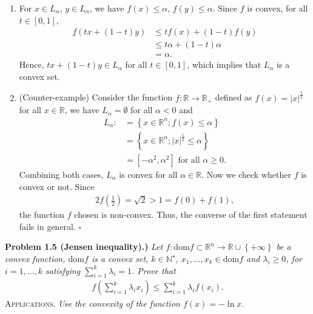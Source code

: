 \documentclass[a4paper]{article}
\numberwithin{equation}{section}
\begin{document}
\begin{enumerate}
\item For $x\in L_\alpha$, $y\in L_\alpha$, we have $f\left(x\right)\le \alpha$, $f\left(y\right)\le \alpha$. Since $f$ is convex, for all $t\in \left[0,1\right]$,
\begin{align}
f\left( {tx + \left( {1 - t} \right)y} \right) &\le tf\left( x \right) + \left( {1 - t} \right)f\left( y \right)\\
& \le t\alpha  + \left( {1 - t} \right)\alpha \\
& = \alpha .
\end{align}
Hence, $tx + \left( {1 - t} \right)y \in {L_\alpha }$ for all $t\in \left[0,1\right]$, which implies that $L_\alpha$ is a convex set.
\item (Counter-example) Consider the function $f: \mathbb{R}\to \mathbb{R}_+$ defined as $f\left( x \right) = {\left| x \right|^{\frac{1}{2}}}$ for all $x\in \mathbb{R}$, we have $L_\alpha =\emptyset$ for all $\alpha <0$ and 
\begin{align}
{L_\alpha }: &= \left\{ {x \in {\mathbb{R}^n};f\left( x \right) \le \alpha } \right\}\\
 &= \left\{ {x \in {\mathbb{R}^n};{{\left| x \right|}^{\frac{1}{2}}} \le \alpha } \right\}\\
& = \left[ { - {\alpha ^2},{\alpha ^2}} \right] \mbox{ for all } \alpha \ge 0.
\end{align}
Combining both cases, $L_\alpha$ is convex for all $\alpha \in \mathbb{R}$. Now we check whether $f$ is convex or not. Since 
\begin{align}
2f\left( {\frac{1}{2}} \right) = \sqrt 2  > 1 = f\left( 0 \right) + f\left( 1 \right),
\end{align}
the function $f$ chosen is non-convex. Thus, the converse of the first statement fails in general. \hfill $\square$
\end{enumerate}
\textbf{Problem 1.5 (Jensen inequality).)} \textit{Let $f:\mbox{dom} f \subset {\mathbb{R}^n} \to \mathbb{R} \cup \left\{ { + \infty } \right\}$ be a convex function, $\mbox{dom}f$ is a convex set, $k\in \mathbb{N}^\star$, $x_1,\ldots,x_k\in \mbox{dom} f$ and $\lambda _i \ge 0$, for $i=1,\ldots,k$ satisfying $\sum\nolimits_{i = 1}^k {{\lambda _i}}  = 1$. Prove that}
\begin{align}
\label{1.24}
f\left( {\sum\limits_{i = 1}^k {{\lambda _i}{x_i}} } \right) \le \sum\limits_{i = 1}^k {{\lambda _i}f\left( {{x_i}} \right)} .
\end{align}
\textsc{Applications.} \textit{Use the convexity of the function $f\left(x\right) =-\ln x$.}
\end{document}
